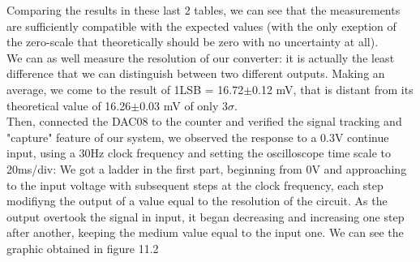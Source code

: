 Comparing the results in these last 2 tables, we can see that the measurements are sufficiently compatible with the expected values (with the only exeption of the zero-scale that theoretically should be zero with no uncertainty at all).\\
We can as well measure the resolution of our converter: it is actually the least difference that we can distinguish between two different outputs. Making an average, we come to the result of 1LSB = 16.72\(\pm\)0.12 mV, that is distant from its theoretical value of 16.26\(\pm\)0.03 mV of only 3\(\sigma\). \\
Then, connected the DAC08 to the counter and verified the signal tracking and "capture" feature of our system, we observed the response to a 0.3V continue input, using a 30Hz clock frequency and setting the oscilloscope time scale to 20ms/div: We got a ladder in the first part, beginning from 0V and approaching to the input voltage with subsequent steps at the clock frequency, each step modifiyng the output of a value equal to the resolution of the circuit. As the output overtook the signal in input, it began decreasing and increasing one step after another, keeping the medium value equal to the input one.
We can see the graphic obtained in figure 11.2\\


